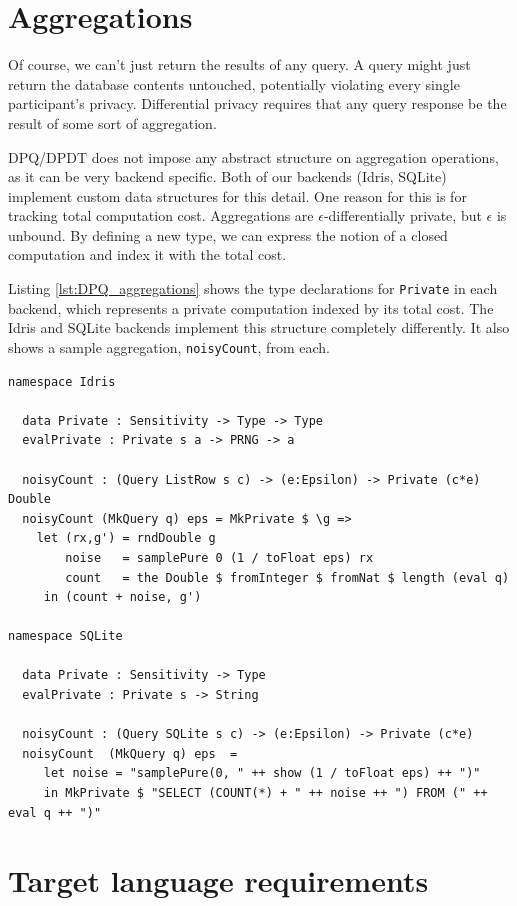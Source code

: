 \documentclass[12pt]{report}
\begin{document}
\section{Aggregations}\label{seq:DPQ_aggregations}

Of course, we can't just return the results of any query.
A query might just return the database contents untouched, potentially violating every single participant's privacy.
Differential privacy requires that any query response be the result of some sort of aggregation.

DPQ/DPDT does not impose any abstract structure on aggregation operations, as it can be very backend specific.
Both of our backends (Idris, SQLite) implement custom data structures for this detail.
One reason for this is for tracking total computation cost.
Aggregations are $\epsilon$-differentially private, but $\epsilon$ is unbound.
By defining a new type, we can express the notion of a closed computation and index it with the total cost.

Listing \ref{lst:DPQ_aggregations} shows the type declarations for \texttt{Private} in each backend, which represents a private computation indexed by its total cost.
The Idris and SQLite backends implement this structure completely differently.
It also shows a sample aggregation, \texttt{noisyCount}, from each.

\begin{lstlisting}[float,caption={Noisy aggregations}, label={lst:DPQ_aggregations}]
namespace Idris

  data Private : Sensitivity -> Type -> Type
  evalPrivate : Private s a -> PRNG -> a

  noisyCount : (Query ListRow s c) -> (e:Epsilon) -> Private (c*e) Double
  noisyCount (MkQuery q) eps = MkPrivate $ \g =>
    let (rx,g') = rndDouble g
        noise   = samplePure 0 (1 / toFloat eps) rx
        count   = the Double $ fromInteger $ fromNat $ length (eval q)
     in (count + noise, g')

namespace SQLite

  data Private : Sensitivity -> Type
  evalPrivate : Private s -> String

  noisyCount : (Query SQLite s c) -> (e:Epsilon) -> Private (c*e)
  noisyCount  (MkQuery q) eps  =
     let noise = "samplePure(0, " ++ show (1 / toFloat eps) ++ ")"
     in MkPrivate $ "SELECT (COUNT(*) + " ++ noise ++ ") FROM (" ++ eval q ++ ")"
\end{lstlisting}

\section{Target language requirements}\label{sec:DPQ_requirements}
\end{document}

